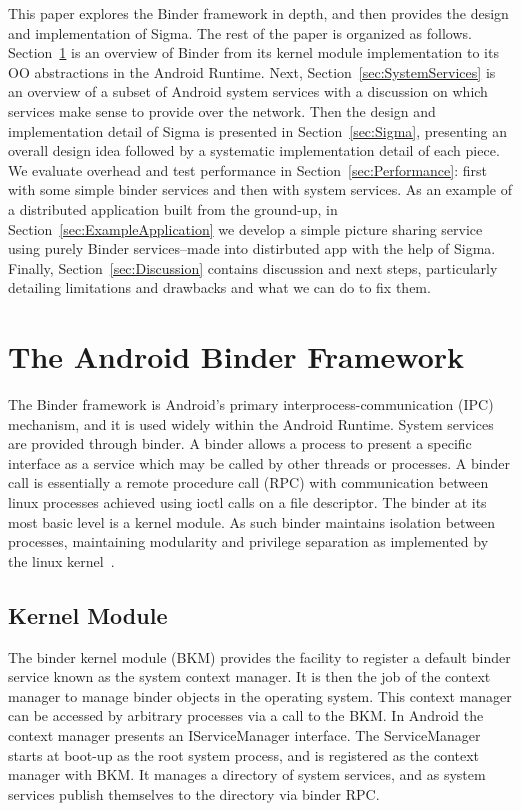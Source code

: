 \documentclass[prodmode]{acmlarge}
\begin{document}
This paper explores the Binder framework in depth, and then provides the design and implementation of Sigma. The rest of the paper is organized as follows. Section~\ref{sec:AndroidBinderFramework} is an overview of Binder from its kernel module implementation to its OO abstractions in the Android Runtime. Next, Section~\ref{sec:SystemServices} is an overview of a subset of Android system services with a discussion on which services make sense to provide over the network. Then the design and implementation detail of Sigma is presented in Section~\ref{sec:Sigma}, presenting an overall design idea followed by a systematic implementation detail of each piece. We evaluate overhead and test performance in Section~\ref{sec:Performance}: first with some simple binder services and then with system services. As an example of a distributed application built from the ground-up, in Section~\ref{sec:ExampleApplication} we develop a simple picture sharing service using purely Binder services--made into distirbuted app with the help of Sigma. Finally, Section~\ref{sec:Discussion} contains discussion and next steps, particularly detailing limitations and drawbacks and what we can do to fix them.

\section{The Android Binder Framework}
\label{sec:AndroidBinderFramework}
The Binder framework is Android's primary interprocess-communication (IPC) mechanism, and it is used widely within the Android Runtime. System services are provided through binder.
A binder allows a process to present a specific interface as a service which may be called by other threads or processes. A binder call is essentially a remote procedure call (RPC) with communication between linux processes achieved using ioctl calls on a file descriptor. The binder at its most basic level is a kernel module. As such binder maintains isolation between processes, maintaining modularity and privilege separation as implemented by the linux kernel~\cite{OpenBinder}.

\subsection{Kernel Module}
The binder kernel module (BKM) provides the facility to register a default binder service known as the system context manager. It is then the job of the context manager to manage binder objects in the operating system. This context manager can be accessed by arbitrary processes via a call to the BKM. In Android the context manager presents an IServiceManager interface. The ServiceManager starts at boot-up as the root system process, and is registered as the context manager with BKM. It manages a directory of system services, and as system services publish themselves to the directory via binder RPC.
\end{document}
